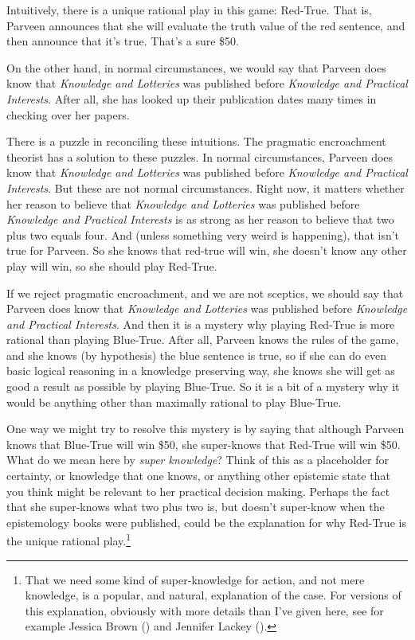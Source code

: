 \documentclass[
  10pt,
  letterpaper,
  DIV=11,
  numbers=noendperiod,
  twoside]{scrartcl}
\begin{document}
Intuitively, there is a unique rational play in this game: Red-True.
That is, Parveen announces that she will evaluate the truth value of the
red sentence, and then announce that it's true. That's a sure \$50.

On the other hand, in normal circumstances, we would say that Parveen
does know that \emph{Knowledge and Lotteries} was published before
\emph{Knowledge and Practical Interests}. After all, she has looked up
their publication dates many times in checking over her papers.

There is a puzzle in reconciling these intuitions. The pragmatic
encroachment theorist has a solution to these puzzles. In normal
circumstances, Parveen does know that \emph{Knowledge and Lotteries} was
published before \emph{Knowledge and Practical Interests}. But these are
not normal circumstances. Right now, it matters whether her reason to
believe that \emph{Knowledge and Lotteries} was published before
\emph{Knowledge and Practical Interests} is as strong as her reason to
believe that two plus two equals four. And (unless something very weird
is happening), that isn't true for Parveen. So she knows that red-true
will win, she doesn't know any other play will win, so she should play
Red-True.

If we reject pragmatic encroachment, and we are not sceptics, we should
say that Parveen does know that \emph{Knowledge and Lotteries} was
published before \emph{Knowledge and Practical Interests}. And then it
is a mystery why playing Red-True is more rational than playing
Blue-True. After all, Parveen knows the rules of the game, and she knows
(by hypothesis) the blue sentence is true, so if she can do even basic
logical reasoning in a knowledge preserving way, she knows she will get
as good a result as possible by playing Blue-True. So it is a bit of a
mystery why it would be anything other than maximally rational to play
Blue-True.

One way we might try to resolve this mystery is by saying that although
Parveen knows that Blue-True will win \$50, she super-knows that
Red-True will win \$50. What do we mean here by \emph{super knowledge}?
Think of this as a placeholder for certainty, or knowledge that one
knows, or anything other epistemic state that you think might be
relevant to her practical decision making. Perhaps the fact that she
super-knows what two plus two is, but doesn't super-know when the
epistemology books were published, could be the explanation for why
Red-True is the unique rational play.\footnote{That we need some kind of
  super-knowledge for action, and not mere knowledge, is a popular, and
  natural, explanation of the case. For versions of this explanation,
  obviously with more details than I've given here, see for example
  Jessica Brown () and Jennifer Lackey
  ().}
\end{document}
